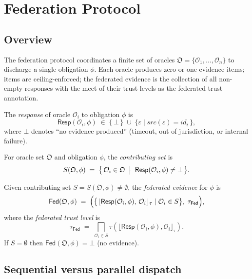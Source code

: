 \documentclass[11pt]{article}
\newcommand{\Oracle}{\mathcal{O}}            %
\newcommand{\OrcSet}{\mathfrak{O}}           %
\newcommand{\Orcl}[1]{\Oracle_{#1}}         %
\newcommand{\tlev}[1]{\tau(#1)}              %
\newcommand{\Fed}{\mathsf{Fed}}             %
\newcommand{\Ceil}[1]{\lfloor #1 \rfloor_{\tau}}   %
\newcommand{\EvidItem}{\varepsilon}          %
\newcommand{\Resp}{\mathsf{Resp}}           %
\begin{document}
\section{Federation Protocol}\label{sec:fed-protocol}

\subsection{Overview}

The federation protocol coordinates a finite set of oracles
$\OrcSet = \{\Orcl{1}, \ldots, \Orcl{n}\}$ to discharge a single
obligation $\phi$.  Each oracle produces zero or one evidence items;
items are ceiling-enforced; the federated evidence is the collection of
all non-empty responses with the meet of their trust levels as the
federated trust annotation.

\begin{definition}\label{def:oracle-resp}
  The \emph{response} of oracle $\Orcl{i}$ to obligation $\phi$ is
  \[
    \Resp(\Orcl{i}, \phi) \;\in\;
    \{\,\bot\,\} \;\cup\; \{\EvidItem \mid \mathit{src}(\EvidItem) = \mathit{id}_i\,\},
  \]
  where $\bot$ denotes ``no evidence produced'' (timeout, out of
  jurisdiction, or internal failure).
\end{definition}

\begin{definition}\label{def:contrib}
  For oracle set $\OrcSet$ and obligation $\phi$, the
  \emph{contributing set} is
  \[
    S(\OrcSet, \phi) \;=\;
    \bigl\{\, \Orcl{i} \in \OrcSet \;\bigm|\;
       \Resp(\Orcl{i},\phi) \neq \bot \,\bigr\}.
  \]
\end{definition}

\begin{definition}\label{def:fed-evid}
  Given contributing set $S = S(\OrcSet,\phi) \neq \emptyset$, the
  \emph{federated evidence} for $\phi$ is
  \[
    \Fed(\OrcSet, \phi) \;=\;
    \Bigl(
      \bigl\{\Ceil{\Resp(\Orcl{i},\phi),\, \Orcl{i}}
             \mid \Orcl{i} \in S\bigr\},\;
      \tau_{\Fed}
    \Bigr),
  \]
  where the \emph{federated trust level} is
  \[
    \tau_{\Fed} \;=\;
    \bigsqcap_{\Orcl{i} \in S} \tlev{\Ceil{\Resp(\Orcl{i},\phi),\Orcl{i}}}.
  \]
  If $S = \emptyset$ then $\Fed(\OrcSet,\phi) = \bot$ (no evidence).
\end{definition}

\subsection{Sequential versus parallel dispatch}
\end{document}
